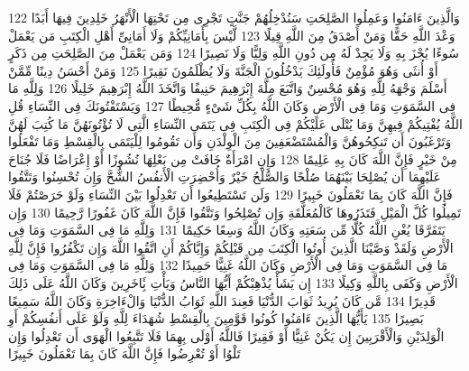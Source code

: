 {\tiny\colorbox{cl_aya}{122}} وَالَّذِينَ ءَامَنُوا وَعَمِلُوا الصَّلِحَتِ سَنُدْخِلُهُمْ جَنَّتٍ تَجْرِى مِن تَحْتِهَا الْأَنْهَرُ خَلِدِينَ فِيهَا أَبَدًا وَعْدَ اللَّهِ حَقًّا وَمَنْ أَصْدَقُ مِنَ اللَّهِ قِيلًا
{\tiny\colorbox{cl_aya}{123}} لَّيْسَ بِأَمَانِيِّكُمْ وَلَا أَمَانِىِّ أَهْلِ الْكِتَبِ مَن يَعْمَلْ سُوءًا يُجْزَ بِهِ وَلَا يَجِدْ لَهُ مِن دُونِ اللَّهِ وَلِيًّا وَلَا نَصِيرًا
{\tiny\colorbox{cl_aya}{124}} وَمَن يَعْمَلْ مِنَ الصَّلِحَتِ مِن ذَكَرٍ أَوْ أُنثَى وَهُوَ مُؤْمِنٌ فَأُولَئِكَ يَدْخُلُونَ الْجَنَّةَ وَلَا يُظْلَمُونَ نَقِيرًا
{\tiny\colorbox{cl_aya}{125}} وَمَنْ أَحْسَنُ دِينًا مِّمَّنْ أَسْلَمَ وَجْهَهُ لِلَّهِ وَهُوَ مُحْسِنٌ وَاتَّبَعَ مِلَّةَ إِبْرَهِيمَ حَنِيفًا وَاتَّخَذَ اللَّهُ إِبْرَهِيمَ خَلِيلًا
{\tiny\colorbox{cl_aya}{126}} وَلِلَّهِ مَا فِى السَّمَوَتِ وَمَا فِى الْأَرْضِ وَكَانَ اللَّهُ بِكُلِّ شَىْءٍ مُّحِيطًا
{\tiny\colorbox{cl_aya}{127}} وَيَسْتَفْتُونَكَ فِى النِّسَاءِ قُلِ اللَّهُ يُفْتِيكُمْ فِيهِنَّ وَمَا يُتْلَى عَلَيْكُمْ فِى الْكِتَبِ فِى يَتَمَى النِّسَاءِ الَّتِى لَا تُؤْتُونَهُنَّ مَا كُتِبَ لَهُنَّ وَتَرْغَبُونَ أَن تَنكِحُوهُنَّ وَالْمُسْتَضْعَفِينَ مِنَ الْوِلْدَنِ وَأَن تَقُومُوا لِلْيَتَمَى بِالْقِسْطِ وَمَا تَفْعَلُوا مِنْ خَيْرٍ فَإِنَّ اللَّهَ كَانَ بِهِ عَلِيمًا
{\tiny\colorbox{cl_aya}{128}} وَإِنِ امْرَأَةٌ خَافَتْ مِن بَعْلِهَا نُشُوزًا أَوْ إِعْرَاضًا فَلَا جُنَاحَ عَلَيْهِمَا أَن يُصْلِحَا بَيْنَهُمَا صُلْحًا وَالصُّلْحُ خَيْرٌ وَأُحْضِرَتِ الْأَنفُسُ الشُّحَّ وَإِن تُحْسِنُوا وَتَتَّقُوا فَإِنَّ اللَّهَ كَانَ بِمَا تَعْمَلُونَ خَبِيرًا
{\tiny\colorbox{cl_aya}{129}} وَلَن تَسْتَطِيعُوا أَن تَعْدِلُوا بَيْنَ النِّسَاءِ وَلَوْ حَرَصْتُمْ فَلَا تَمِيلُوا كُلَّ الْمَيْلِ فَتَذَرُوهَا كَالْمُعَلَّقَةِ وَإِن تُصْلِحُوا وَتَتَّقُوا فَإِنَّ اللَّهَ كَانَ غَفُورًا رَّحِيمًا
{\tiny\colorbox{cl_aya}{130}} وَإِن يَتَفَرَّقَا يُغْنِ اللَّهُ كُلًّا مِّن سَعَتِهِ وَكَانَ اللَّهُ وَسِعًا حَكِيمًا
{\tiny\colorbox{cl_aya}{131}} وَلِلَّهِ مَا فِى السَّمَوَتِ وَمَا فِى الْأَرْضِ وَلَقَدْ وَصَّيْنَا الَّذِينَ أُوتُوا الْكِتَبَ مِن قَبْلِكُمْ وَإِيَّاكُمْ أَنِ اتَّقُوا اللَّهَ وَإِن تَكْفُرُوا فَإِنَّ لِلَّهِ مَا فِى السَّمَوَتِ وَمَا فِى الْأَرْضِ وَكَانَ اللَّهُ غَنِيًّا حَمِيدًا
{\tiny\colorbox{cl_aya}{132}} وَلِلَّهِ مَا فِى السَّمَوَتِ وَمَا فِى الْأَرْضِ وَكَفَى بِاللَّهِ وَكِيلًا
{\tiny\colorbox{cl_aya}{133}} إِن يَشَأْ يُذْهِبْكُمْ أَيُّهَا النَّاسُ وَيَأْتِ بَِٔاخَرِينَ وَكَانَ اللَّهُ عَلَى ذَلِكَ قَدِيرًا
{\tiny\colorbox{cl_aya}{134}} مَّن كَانَ يُرِيدُ ثَوَابَ الدُّنْيَا فَعِندَ اللَّهِ ثَوَابُ الدُّنْيَا وَالْءَاخِرَةِ وَكَانَ اللَّهُ سَمِيعًا بَصِيرًا
{\tiny\colorbox{cl_aya}{135}} يَأَيُّهَا الَّذِينَ ءَامَنُوا كُونُوا قَوَّمِينَ بِالْقِسْطِ شُهَدَاءَ لِلَّهِ وَلَوْ عَلَى أَنفُسِكُمْ أَوِ الْوَلِدَيْنِ وَالْأَقْرَبِينَ إِن يَكُنْ غَنِيًّا أَوْ فَقِيرًا فَاللَّهُ أَوْلَى بِهِمَا فَلَا تَتَّبِعُوا الْهَوَى أَن تَعْدِلُوا وَإِن تَلْوُا أَوْ تُعْرِضُوا فَإِنَّ اللَّهَ كَانَ بِمَا تَعْمَلُونَ خَبِيرًا
